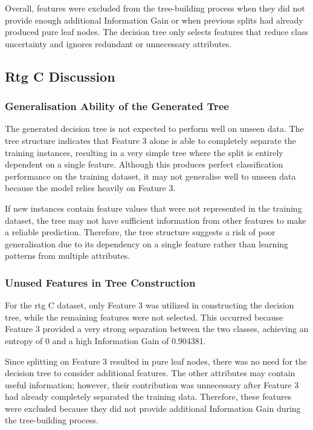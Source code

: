 \documentclass[a4paper,12pt]{article}
\begin{document}
Overall, features were excluded from the tree-building process when they did not
provide enough additional Information Gain or when previous splits had already
produced pure leaf nodes. The decision tree only selects features that reduce
class uncertainty and ignores redundant or unnecessary attributes.

\subsection{Rtg C Discussion}
\subsubsection{Generalisation Ability of the Generated Tree}

The generated decision tree is not expected to perform well on unseen data. The
tree structure indicates that Feature 3 alone is able to completely separate the
training instances, resulting in a very simple tree where the split is entirely
dependent on a single feature. Although this produces perfect classification
performance on the training dataset, it may not generalise well to unseen data
because the model relies heavily on Feature 3.

If new instances contain feature values that were not represented in the training
dataset, the tree may not have sufficient information from other features to make
a reliable prediction. Therefore, the tree structure suggests a risk of poor
generalisation due to its dependency on a single feature rather than learning
patterns from multiple attributes.


\subsubsection{Unused Features in Tree Construction}

For the rtg C dataset, only Feature 3 was utilized in constructing the decision
tree, while the remaining features were not selected. This occurred because
Feature 3 provided a very strong separation between the two classes, achieving an
entropy of 0 and a high Information Gain of 0.904381.

Since splitting on Feature 3 resulted in pure leaf nodes, there was no need for
the decision tree to consider additional features. The other attributes may
contain useful information; however, their contribution was unnecessary after
Feature 3 had already completely separated the training data. Therefore, these
features were excluded because they did not provide additional Information Gain
during the tree-building process.
\end{document}

